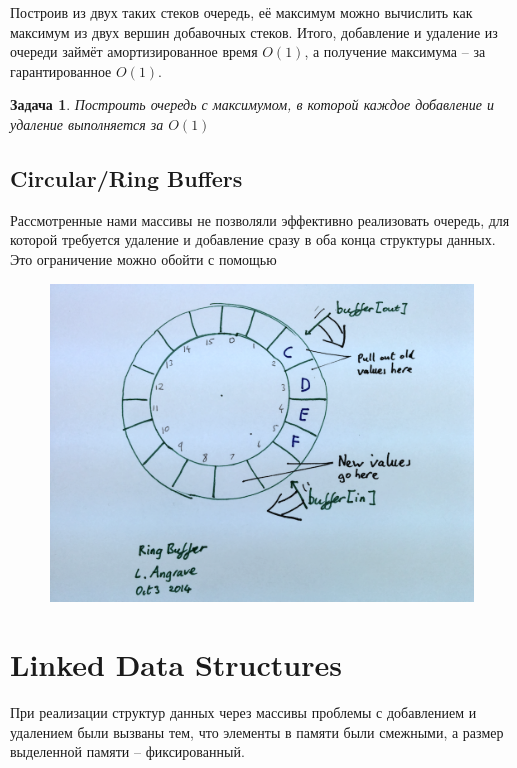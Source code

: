\documentclass[12pt,a4paper]{report}
\newtheorem*{problem}{Задача}
\begin{document}
Построив из двух таких стеков очередь, её максимум можно вычислить как максимум из двух вершин добавочных стеков. Итого, добавление и удаление из очереди займёт амортизированное время $O(1)$, а получение максимума -- за гарантированное $O(1)$.

\begin{problem}
Построить очередь с максимумом, в которой {\em каждое} добавление и удаление выполняется за $O(1)$
\end{problem}

\subsection*{Circular/Ring Buffers}

Рассмотренные нами массивы не позволяли эффективно реализовать очередь, для которой требуется удаление и добавление сразу в оба конца структуры данных. Это ограничение можно обойти с помощью 

\begin{figure}[!ht]
\centering
\includegraphics[width=16cm]{ringbuffer.png}
\end{figure}


\section*{Linked Data Structures}

При реализации структур данных через массивы проблемы с добавлением и удалением были вызваны тем, что элементы в памяти были смежными, а размер выделенной памяти -- фиксированный.
\end{document}
